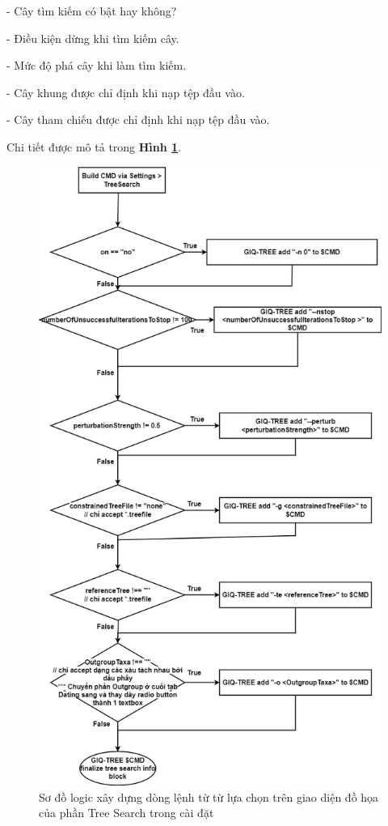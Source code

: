 \documentclass[12pt]{report}
\begin{document}
- Cây tìm kiếm có bật hay không?

- Điều kiện dừng khi tìm kiếm cây.

- Mức độ phá cây khi làm tìm kiếm.

- Cây khung được chỉ định khi nạp tệp đầu vào.

- Cây tham chiếu được chỉ định khi nạp tệp đầu vào.

Chi tiết được mô tả trong  \textbf{Hình \ref{fig:image4.10}}.

\begin{figure}[h]
	\centering
	\includegraphics[scale=0.4]{Image/4.10.png}
	\caption{Sơ đồ logic xây dựng dòng lệnh từ từ lựa chọn trên giao diện đồ họa của phần Tree Search trong cài đặt }
	\label{fig:image4.10}
\end{figure}
\end{document}
